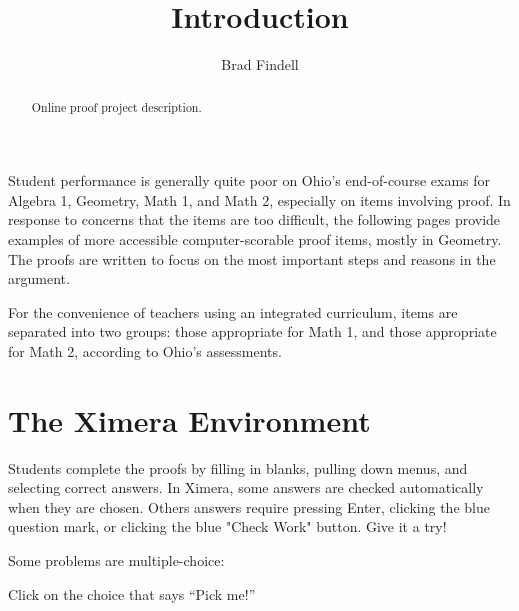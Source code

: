 \documentclass[nooutcomes]{ximera}
\title{Introduction}
\author{Brad Findell}
\begin{document}
\begin{abstract}
Online proof project description. 
\end{abstract}
\maketitle

Student performance is generally quite poor on Ohio's end-of-course exams for Algebra 1, Geometry, Math 1, and Math 2, especially on items involving proof.  In response to concerns that the items are too difficult, the following pages provide examples of more accessible computer-scorable proof items, mostly in Geometry.  The proofs are written to focus on the most important steps and reasons in the argument.

For the convenience of teachers using an integrated curriculum, items are separated into two groups: those appropriate for Math 1, and those appropriate for Math 2, according to Ohio's assessments.  


\section{The Ximera Environment}
Students complete the proofs by filling in blanks, pulling down menus, and selecting correct answers.  
In Ximera, some answers are checked automatically when they are chosen.  Others answers require pressing Enter, clicking the blue question mark, or clicking the blue "Check Work" button. Give it a try!  

\begin{example}
  Some problems are multiple-choice:
  \begin{multipleChoice}
  \end{multipleChoice}
  \begin{feedback}
    Click on the choice that says ``Pick me!''
  \end{feedback}
\end{example}
\end{document}
